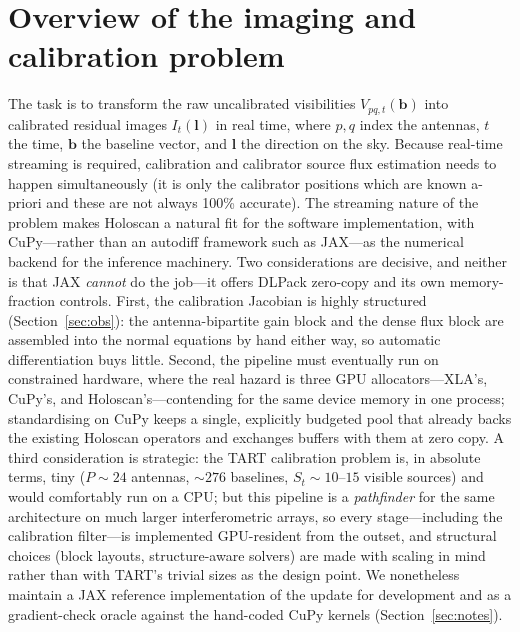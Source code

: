 \documentclass[11pt]{article}
\begin{document}
\section{Overview of the imaging and calibration problem}

The task is to transform the raw uncalibrated visibilities $V_{pq,t}(\bm{b})$ into calibrated residual images $I_{t}(\bm{l})$ in real time, where $p,q$ index the antennas, $t$ the time, $\bm{b}$ the baseline vector, and $\bm{l}$ the direction on the sky. Because real-time streaming is required, calibration and calibrator source flux estimation needs to happen simultaneously (it is only the calibrator positions which are known a-priori and these are not always 100\% accurate). The streaming nature of the problem makes Holoscan a natural fit for the software implementation, with CuPy---rather than an autodiff framework such as JAX---as the numerical backend for the inference machinery. Two considerations are decisive, and neither is that JAX \emph{cannot} do the job---it offers DLPack zero-copy and its own memory-fraction controls. First, the calibration Jacobian is highly structured (Section~\ref{sec:obs}): the antenna-bipartite gain block and the dense flux block are assembled into the normal equations by hand either way, so automatic differentiation buys little. Second, the pipeline must eventually run on constrained hardware, where the real hazard is three GPU allocators---XLA's, CuPy's, and Holoscan's---contending for the same device memory in one process; standardising on CuPy keeps a single, explicitly budgeted pool that already backs the existing Holoscan operators and exchanges buffers with them at zero copy. A third consideration is strategic: the TART calibration problem is, in absolute terms, tiny ($P\sim24$ antennas, $\sim\!276$ baselines, $S_t\sim10$--$15$ visible sources) and would comfortably run on a CPU; but this pipeline is a \emph{pathfinder} for the same architecture on much larger interferometric arrays, so every stage---including the calibration filter---is implemented GPU-resident from the outset, and structural choices (block layouts, structure-aware solvers) are made with scaling in mind rather than with TART's trivial sizes as the design point. We nonetheless maintain a JAX reference implementation of the update for development and as a gradient-check oracle against the hand-coded CuPy kernels (Section~\ref{sec:notes}).
\end{document}
